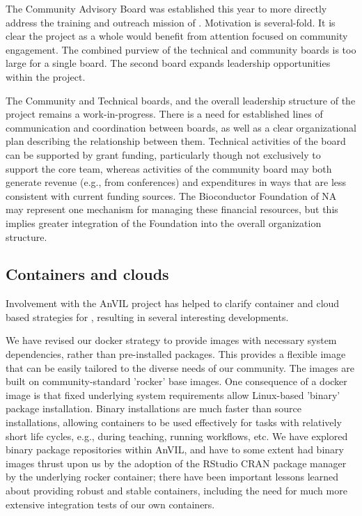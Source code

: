 \documentclass[letterpaper]{article}
\begin{document}
The Community Advisory Board was established this year to more
directly address the training and outreach mission of
\Bioconductor. Motivation is several-fold. It is clear the project as
a whole would benefit from attention focused on community
engagement. The combined purview of the technical and community boards
is too large for a single board. The second board expands leadership
opportunities within the project.

The Community and Technical boards, and the overall leadership
structure of the project remains a work-in-progress. There is a need
for established lines of communication and coordination between
boards, as well as a clear organizational plan describing the
relationship between them. Technical activities of the board can be
supported by grant funding, particularly though not exclusively to
support the core team, whereas activities of the community board may
both generate revenue (e.g., from conferences) and expenditures in
ways that are less consistent with current funding sources. The
Bioconductor Foundation of NA may represent one mechanism for managing
these financial resources, but this implies greater integration of the
Foundation into the overall organization structure.

\subsection{Containers and clouds}

Involvement with the AnVIL project has helped to clarify container and
cloud based strategies for \Bioconductor, resulting in several
interesting developments.

We have revised our docker strategy to provide images with necessary
system dependencies, rather than pre-installed packages. This provides
a flexible image that can be easily tailored to the diverse needs of
our community. The images are built on community-standard 'rocker'
base images. One consequence of a docker image is that fixed
underlying system requirements allow Linux-based 'binary' package
installation. Binary installations are much faster than source
installations, allowing containers to be used effectively for tasks
with relatively short life cycles, e.g., during teaching, running
workflows, etc. We have explored binary \Bioconductor{} package
repositories within AnVIL, and have to some extent had binary images
thrust upon us by the adoption of the RStudio CRAN package manager by
the underlying rocker container; there have been important lessons
learned about providing robust and stable containers, including the
need for much more extensive integration tests of our own containers.
\end{document}
